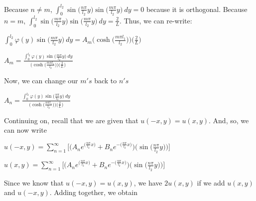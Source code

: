 \documentclass[executivepaper]{article}
\begin{document}
\begin{flushleft}
\begin{center}
\end{center}

Because $n \neq m$, $\int_{0}^{l_{2}} \sin\bigg(\frac{n \pi}{l_{2}} y\bigg) \sin\bigg(\frac{m \pi}{l_{2}} y\bigg) \ dy=0$ because it is orthogonal. Because $n=m$, $\int_{0}^{l_{2}} \sin\bigg(\frac{m \pi}{l_{2}} y\bigg) \sin\bigg(\frac{m \pi}{l_{2}} y\bigg) \ dy=\frac{2}{L}$. Thus, we can re-write:

\begin{center}

$\int_{0}^{l_{2}} \varphi(y) \sin\bigg(\frac{m \pi}{l_{2}} y\bigg) \ dy=A_{m} \bigg(\cosh\bigg(\frac{m \pi l_{1}}{l_{2}}\bigg)\bigg) \bigg(\frac{2}{L}\bigg)$

\vspace{2mm}

$A_{m}=\frac{\int_{0}^{l_{2}} \varphi(y) \sin\bigg(\frac{m \pi}{l_{2}} y\bigg) \ dy}{\bigg(\cosh\bigg(\frac{m \pi l_{1}}{l_{2}}\bigg)\bigg) \bigg(\frac{2}{L}\bigg)}$

\end{center}

Now, we can change our $m's$ back to $n's$

\begin{center}

$A_{n}=\frac{\int_{0}^{l_{2}} \varphi(y) \sin\bigg(\frac{n \pi}{l_{2}} y\bigg) \ dy}{\bigg(\cosh\bigg(\frac{n \pi l_{1}}{l_{2}}\bigg)\bigg) \bigg(\frac{2}{L}\bigg)}$

\end{center}

Continuing on, recall that we are given that $u(-x,y)=u(x,y)$. And, so, we can now write

\begin{center}

$u(-x,y)=\sum_{n=1}^{\infty} \bigg[\bigg(A_{n} e^{\Big(\frac{n \pi}{l_{2}} x\Big)} + B_{n} e^{-\Big(\frac{n \pi}{l_{2}} x\Big)}\bigg) \bigg(\sin\bigg(\frac{n \pi}{l_{2}} y\bigg)\bigg)\bigg]$

\vspace{2mm}

$u(x,y)=\sum_{n=1}^{\infty} \bigg[\bigg(A_{n} e^{\Big(\frac{n \pi}{l_{2}} x\Big)} + B_{n} e^{-\Big(\frac{n \pi}{l_{2}} x\Big)}\bigg) \bigg(\sin\bigg(\frac{n \pi}{l_{2}} y\bigg)\bigg)\bigg]$

\end{center}

Since we know that $u(-x,y)=u(x,y)$, we have $2u(x,y)$ if we add $u(x,y)$ and $u(-x,y)$. Adding together, we obtain


\end{flushleft}
\end{document}
